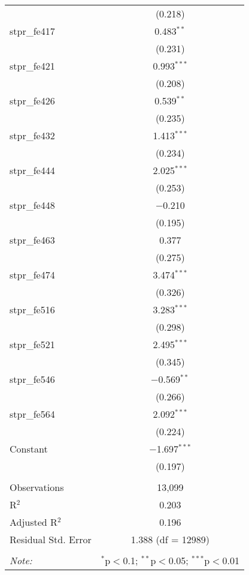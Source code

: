 \begin{table}[!htbp]
\begin{tabular}{@{\extracolsep{5pt}}lc}
  & (0.218) \\ 
  stpr\_fe417 & 0.483$^{**}$ \\ 
  & (0.231) \\ 
  stpr\_fe421 & 0.993$^{***}$ \\ 
  & (0.208) \\ 
  stpr\_fe426 & 0.539$^{**}$ \\ 
  & (0.235) \\ 
  stpr\_fe432 & 1.413$^{***}$ \\ 
  & (0.234) \\ 
  stpr\_fe444 & 2.025$^{***}$ \\ 
  & (0.253) \\ 
  stpr\_fe448 & $-$0.210 \\ 
  & (0.195) \\ 
  stpr\_fe463 & 0.377 \\ 
  & (0.275) \\ 
  stpr\_fe474 & 3.474$^{***}$ \\ 
  & (0.326) \\ 
  stpr\_fe516 & 3.283$^{***}$ \\ 
  & (0.298) \\ 
  stpr\_fe521 & 2.495$^{***}$ \\ 
  & (0.345) \\ 
  stpr\_fe546 & $-$0.569$^{**}$ \\ 
  & (0.266) \\ 
  stpr\_fe564 & 2.092$^{***}$ \\ 
  & (0.224) \\ 
  Constant & $-$1.697$^{***}$ \\ 
  & (0.197) \\ 
 \hline \\[-1.8ex] 
Observations & 13,099 \\ 
R$^{2}$ & 0.203 \\ 
Adjusted R$^{2}$ & 0.196 \\ 
Residual Std. Error & 1.388 (df = 12989) \\ 
\hline 
\hline \\[-1.8ex] 
\textit{Note:}  & \multicolumn{1}{r}{$^{*}$p$<$0.1; $^{**}$p$<$0.05; $^{***}$p$<$0.01} \\ 
\end{tabular} 
\end{table} 
